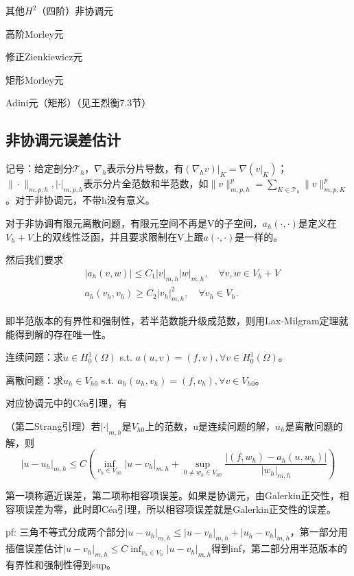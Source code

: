 其他$H^2$（四阶）非协调元

高阶Morley元

修正Zienkiewicz元

矩形Morley元

Adini元（矩形）（见王烈衡7.3节）

\subsection{非协调元误差估计}

记号：给定剖分$\mathcal{T}_h$，$\nabla_h$表示分片导数，有$(\nabla_h v)|_K = \nabla (v|_K)$；$\|\cdot\|_{m, p, h}, |\cdot|_{m, p, h}$表示分片全范数和半范数，如$\|v\|_{m, p, h}^p = \sum_{K \in \mathcal{T}_h} \|v\|_{m, p, K}^p$。对于非协调元，不带h没有意义。

对于非协调有限元离散问题，有限元空间不再是V的子空间，$a_{h}(\cdot, \cdot)$是定义在$V_{h}+V$上的双线性泛函，并且要求限制在V上跟$a(\cdot, \cdot)$是一样的。

然后我们要求
\[
  \begin{aligned}
    &\left|a_{h}(v, w)\right| \le C_{1}|v|_{m, h}|w|_{m, h}, \quad \forall v, w \in V_{h}+V \\
    &a_{h}\left(v_{h}, v_{h}\right) \ge C_{2}\left|v_{h}\right|_{m, h}^{2}, \quad \forall v_h \in V_h.
  \end{aligned}
\]

即半范版本的有界性和强制性，若半范数能升级成范数，则用Lax-Milgram定理就能得到解的存在唯一性。

连续问题：求$u \in H_0^1(\Omega)$ s.t. $a(u, v) = (f, v), \forall v \in H_0^1(\Omega)$。

离散问题：求$u_h \in V_{h0}$ s.t. $a_h(u_h, v_h) = (f, v_h), \forall v \in V_{h0}$。

对应协调元中的Céa引理，有

\begin{lem}
  （第二Strang引理）若$|\cdot|_{m, h}$是$V_{h 0}$上的范数，u是连续问题的解，$u_{h}$是离散问题的解，则
  \[
    \left|u-u_{h}\right|_{m, h} \le C\left(\inf _{v_{h} \in V_{h 0}}\left|u-v_{h}\right|_{m, h}+\sup _{0 \neq w_{h} \in V_{h 0}} \frac{\left|\left(f, w_{h}\right)-a_{h}\left(u, w_{h}\right)\right|}{\left|w_{h}\right|_{m, h}}\right)
  \]
\end{lem}

第一项称逼近误差，第二项称相容项误差。如果是协调元，由Galerkin正交性，相容项误差为零，此时即Céa引理，所以相容项误差就是Galerkin正交性的误差。

pf: 三角不等式分成两个部分$|u - u_h|_{m, h} \le |u - v_h|_{m, h} + |u_h - v_h|_{m, h}$，第一部分用插值误差估计$|u - v_h|_{m, h} \le C \inf_{v_h \in V_h} |u - v_h|_{m, h}$得到inf，第二部分用半范版本的有界性和强制性得到sup。

